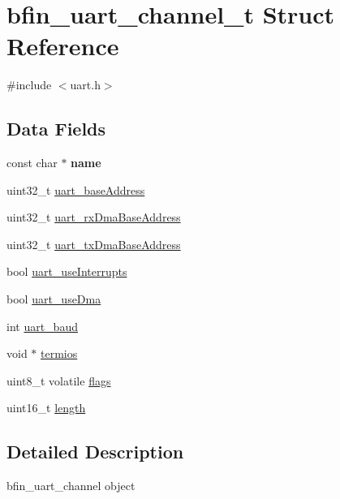 \hypertarget{structbfin__uart__channel__t}{}\section{bfin\+\_\+uart\+\_\+channel\+\_\+t Struct Reference}
\label{structbfin__uart__channel__t}


{\ttfamily \#include $<$uart.\+h$>$}

\subsection*{Data Fields}
\begin{DoxyCompactItemize}
\item 
\mbox{\label{structbfin__uart__channel__t_a7d478f6143405bdf488c192ce010480f}} 
const char $\ast$ {\bfseries name}
\item 
uint32\+\_\+t \mbox{\hyperlink{structbfin__uart__channel__t_a4644ac8746ce466df6812477b1577809}{uart\+\_\+base\+Address}}
\item 
uint32\+\_\+t \mbox{\hyperlink{structbfin__uart__channel__t_a75011802d6b312e5e720117214cb1240}{uart\+\_\+rx\+Dma\+Base\+Address}}
\item 
uint32\+\_\+t \mbox{\hyperlink{structbfin__uart__channel__t_ae1f330b7a26eaeef02c880aa1d67ed69}{uart\+\_\+tx\+Dma\+Base\+Address}}
\item 
bool \mbox{\hyperlink{structbfin__uart__channel__t_a3c3737ae8ae9c93227a9b78cc8743ac7}{uart\+\_\+use\+Interrupts}}
\item 
bool \mbox{\hyperlink{structbfin__uart__channel__t_a93ab0770ccb5d57bafff5c2ab73df07b}{uart\+\_\+use\+Dma}}
\item 
int \mbox{\hyperlink{structbfin__uart__channel__t_a951638b90df768b69af5e4fd9c1c3102}{uart\+\_\+baud}}
\item 
void $\ast$ \mbox{\hyperlink{structbfin__uart__channel__t_a418e151962d9775acda7e73482ad65c8}{termios}}
\item 
uint8\+\_\+t volatile \mbox{\hyperlink{structbfin__uart__channel__t_a622610a82bb33a93ddd1d30216fc92e7}{flags}}
\item 
uint16\+\_\+t \mbox{\hyperlink{structbfin__uart__channel__t_a2976fe257de027d8cf5616ef2862e26e}{length}}
\end{DoxyCompactItemize}


\subsection{Detailed Description}
bfin\+\_\+uart\+\_\+channel object 

